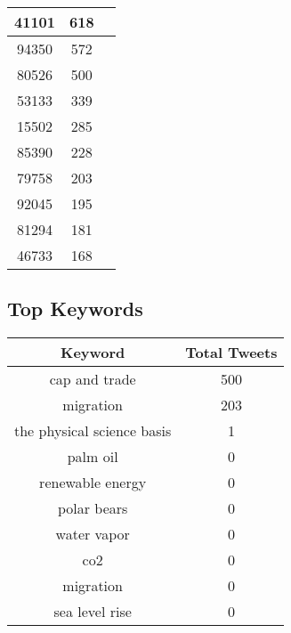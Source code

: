 \documentclass{article}\usepackage[T1]{fontenc}
\begin{document}
\begin{tabular}{|c|c|c|}
 \hline
41101 & 618\\ 
 \hline
94350 & 572\\ 
 \hline
80526 & 500\\ 
 \hline
53133 & 339\\ 
 \hline
15502 & 285\\ 
 \hline
85390 & 228\\ 
 \hline
79758 & 203\\ 
 \hline
92045 & 195\\ 
 \hline
81294 & 181\\ 
 \hline
46733 & 168\\ 
 \hline
\end{tabular}\subsection*{Top Keywords}\begin{tabular}{|c|c|}         \hline         Keyword & Total Tweets \\ 
 \hline
cap and trade & 500\\ 
 \hline
migration & 203\\ 
 \hline
the physical science basis & 1\\ 
 \hline
palm oil & 0\\ 
 \hline
renewable energy & 0\\ 
 \hline
polar bears & 0\\ 
 \hline
water vapor & 0\\ 
 \hline
co2 & 0\\ 
 \hline
migration & 0\\ 
 \hline
sea level rise & 0\\ 
 \hline
\end{tabular}
\end{document}
